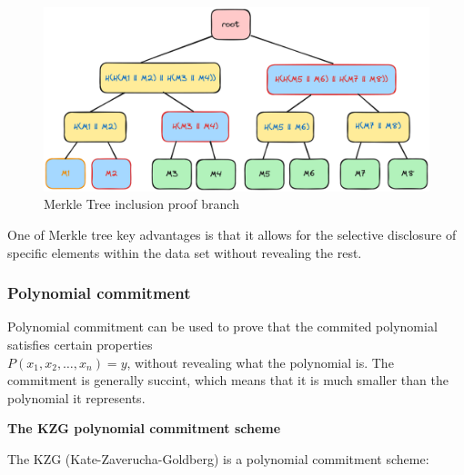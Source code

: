 \documentclass[../lecture-notes.tex]{subfiles}
\begin{document}
\begin{figure}[h!]
    \centering\includegraphics[width=0.9\linewidth, clip]{images/lecture_5/MerkleTreeProof.png}

    \caption{Merkle Tree inclusion proof branch}
\end{figure}

One of Merkle tree key advantages is that it allows for the selective disclosure of specific elements within the data set without revealing the rest. 

\subsubsection{Polynomial commitment}

Polynomial commitment can be used to prove that the commited polynomial satisfies certain properties \\ $P(x_1, x_2, \ldots, x_n) = y$, without revealing what the polynomial is.
The commitment is generally succint, which means that it is much smaller than the polynomial it represents.

\textbf{The KZG polynomial commitment scheme}

The KZG (Kate-Zaverucha-Goldberg) is a polynomial commitment scheme:
\end{document}

